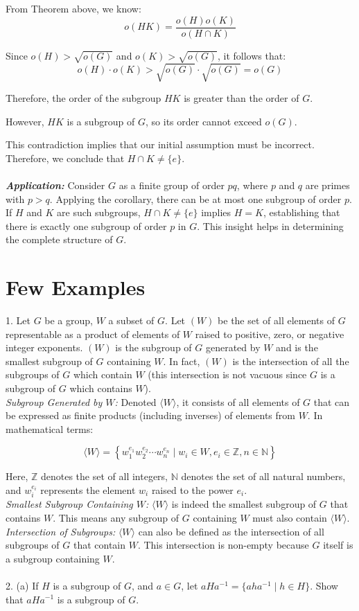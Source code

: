 From Theorem above, we know:
\[ o(HK) = \frac{o(H) o(K)}{o(H \cap K)} \]

Since $o(H) > \sqrt{o(G)}$ and $o(K) > \sqrt{o(G)}$, it follows that:
\[ o(H) \cdot o(K) > \sqrt{o(G)} \cdot \sqrt{o(G)} = o(G) \]

Therefore, the order of the subgroup $HK$ is greater than the order of $G$.

However, $HK$ is a subgroup of $G$, so its order cannot exceed $o(G)$.

This contradiction implies that our initial assumption must be incorrect. Therefore, we conclude that $H \cap K \neq \{e\}$.
\\\\
\textit{\textbf{Application:}} Consider \( G \) as a finite group of order \( pq \), where \( p \) and \( q \) are primes with \( p > q \). Applying the corollary, there can be at most one subgroup of order \( p \). If \( H \) and \( K \) are such subgroups, \( H \cap K \neq \{e\} \) implies \( H = K \), establishing that there is exactly one subgroup of order \( p \) in \( G \). This insight helps in determining the complete structure of \( G \).

\section{Few Examples}
1. Let $G$ be a group, $W$ a subset of $G$. Let $(W)$ be the set of all elements of $G$ representable as a product of elements of $W$ raised to positive, zero, or negative integer exponents. $(W)$ is the subgroup of $G$ generated by $W$ and is the smallest subgroup of $G$ containing $W$. In fact, $(W)$ is the intersection of all the subgroups of $G$ which contain $W$ (this intersection is not vacuous since $G$ is a subgroup of $G$ which contains $W$).\\
\textit{Subgroup Generated by $W$:} Denoted $\langle W \rangle$, it consists of all elements of $G$ that can be expressed as finite products (including inverses) of elements from $W$. In mathematical terms:

\[
\langle W \rangle = \left\{ w_1^{e_1} w_2^{e_2} \cdots w_n^{e_n} \mid w_i \in W, e_i \in \mathbb{Z}, n \in \mathbb{N} \right\}
\]

Here, $\mathbb{Z}$ denotes the set of all integers, $\mathbb{N}$ denotes the set of all natural numbers, and $w_i^{e_i}$ represents the element $w_i$ raised to the power $e_i$.
\\
\textit{Smallest Subgroup Containing $W$:} $\langle W \rangle$ is indeed the smallest subgroup of $G$ that contains $W$. This means any subgroup of $G$ containing $W$ must also contain $\langle W \rangle$.
\\
\textit{Intersection of Subgroups:} $\langle W \rangle$ can also be defined as the intersection of all subgroups of $G$ that contain $W$. This intersection is non-empty because $G$ itself is a subgroup containing $W$.
\\
\\
2. {(a)} If \( H \) is a subgroup of \( G \), and \( a \in G \), let \( aHa^{-1} = \{ aha^{-1} \mid h \in H \} \). Show that \( aHa^{-1} \) is a subgroup of \( G \).

